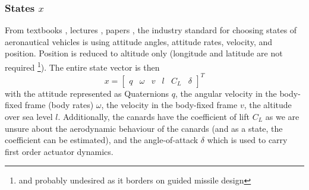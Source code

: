 \subsubsection{States $x$}
From textbooks \cite{zipfel2007, stevens2015, tewari2011},  lectures \cite{theis2023}, papers \cite{minh2012, theis2015}, the industry standard for choosing states of aeronautical vehicles is using attitude angles, attitude rates, velocity, and position. 
Position is reduced to altitude only (longitude and latitude are not required \footnote{and probably undesired as it borders on guided missile design}). 
The entire state vector is then
\begin{equation}
    x =  \begin{bmatrix}
    q & \omega & v & l & C_L & \delta
    \end{bmatrix}^T
    \label{eq:model-state-vector}
\end{equation}
with the attitude represented as Quaternions $q$, the angular velocity in the body-fixed frame (body rates) $\omega$, the velocity in the body-fixed frame $v$, the altitude over sea level $l$. 
Additionally, the canards have the coefficient of lift $C_L$ as we are unsure about the aerodynamic behaviour of the canards (and as a state, the coefficient can be estimated), and the angle-of-attack $\delta$ which is used to carry first order actuator dynamics.


